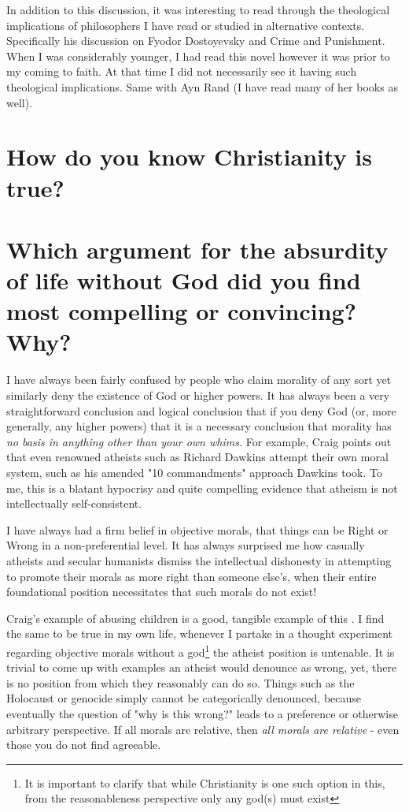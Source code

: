 \documentclass[12pt]{turabian-researchpaper}
\begin{document}
In addition to this discussion, it was interesting to read through the theological implications of philosophers I have read or studied in alternative contexts. Specifically his discussion on Fyodor Dostoyevsky\autocite[pg.68]{craig2008reasonable} and Crime and Punishment. When I was considerably younger, I had read this novel however it was prior to my coming to faith. At that time I did not necessarily see it having such theological implications. Same with Ayn Rand (I have read many of her books as well).




\section*{How do you know Christianity is true?}
\section{Which argument for the absurdity of life without God did you find most compelling or convincing? Why?}
I have always been fairly confused by people who claim morality of any sort yet similarly deny the existence of God or higher powers.  It has always been a very straightforward conclusion and logical conclusion that if you deny God (or, more generally, any higher powers) that it is a necessary conclusion that morality has \textit{no basis in anything other than your own whims.} For example, Craig points out that even renowned atheists such as Richard Dawkins attempt their own moral system, such as his amended "10 commandments"\autocite[pg.81]{craig2008reasonable} approach Dawkins took. To me, this is a blatant hypocrisy and quite compelling evidence that atheism is not intellectually self-consistent.

I have always had a firm belief in objective morals, that things can be Right or Wrong in a non-preferential level. It has always surprised me how casually atheists and secular humanists dismiss the intellectual dishonesty in attempting to promote their morals as more right than someone else's, when their entire foundational position necessitates that such morals do not exist!

Craig's example of abusing children is a good, tangible example of this \autocite[pg. 87-88]{craig2008reasonable}. I find the same to be true in my own life, whenever I partake in a thought experiment regarding objective morals without a god\footnote{It is important to clarify that while Christianity is one such option in this, from the reasonableness perspective only any god(s) must exist} the atheist position is untenable. It is trivial to come up with examples an atheist would denounce as wrong, yet, there is no position from which they reasonably can do so. Things such as the Holocaust or genocide simply cannot be categorically denounced, because eventually the question of "why is this wrong?" leads to a preference or otherwise arbitrary perspective. If all morals are relative, then \textit{all morals are relative} - even those you do not find agreeable.
\end{document}
